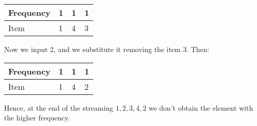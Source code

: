 \documentclass[a4paper]{article}
\begin{document}
\begin{table}[H]
\centering
\begin{tabular}{|l|l|l|l|}
\hline
Frequency & 1 & 1 & 1 \\ \hline
Item      & 1 & 4 & 3 \\ \hline
\end{tabular}
\end{table}
Now we input 2, and we substitute it removing the item 3. Then:
\begin{table}[H]
\centering
\begin{tabular}{|l|l|l|l|}
\hline
Frequency & 1 & 1 & 1 \\ \hline
Item      & 1 & 4 & 2 \\ \hline
\end{tabular}
\end{table}
Hence, at the end of the streaming $1,2,3,4,2$ we don't obtain the element with the higher frequency.
\end{document}
